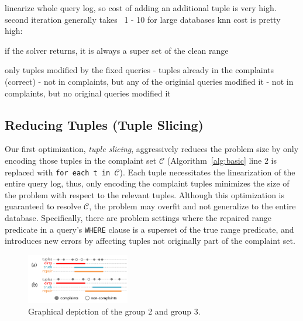 

linearize whole query log, so cost of adding an additional tuple is very high.
second iteration generally takes ~1 - 10%
for large databases knn cost is pretty high: ~

if the solver returns, it is always a super set of the clean range

only tuples modified by the fixed queries
- tuples already in the complaints (correct)
- not in complaints, but any of the originial queries modified it
- not in complaints, but no original queries modified it
\fi



\subsection{Reducing Tuples (Tuple Slicing)}
\label{sec:opt:tbsize}

Our first optimization, \emph{tuple slicing}, aggressively reduces the problem size by only encoding those 
tuples in the complaint set $\mathcal{C}$ (Algorithm~\ref{alg:basic} line $2$ 
is replaced with \texttt{for each t in $\mathcal{C}$}). Each tuple necessitates
the linearization of the entire query log, thus, only encoding the complaint tuples minimizes the 
size of the problem with respect to the relevant tuples.
Although this optimization is guaranteed to resolve $\mathcal{C}$, the problem may overfit 
and not generalize to the entire database.
Specifically, there are problem settings where the repaired range predicate in a query's \texttt{WHERE} clause is a superset of 
the true range predicate, and introduces new errors by affecting tuples not originally part of  the complaint set.

\begin{figure}[t]
    \centering
    \includegraphics[width=0.4\textwidth]{figures/2nditerationgroups}
    \caption{Graphical depiction of the group 2 and group 3. }
    \label{fig:groups}
\end{figure}

